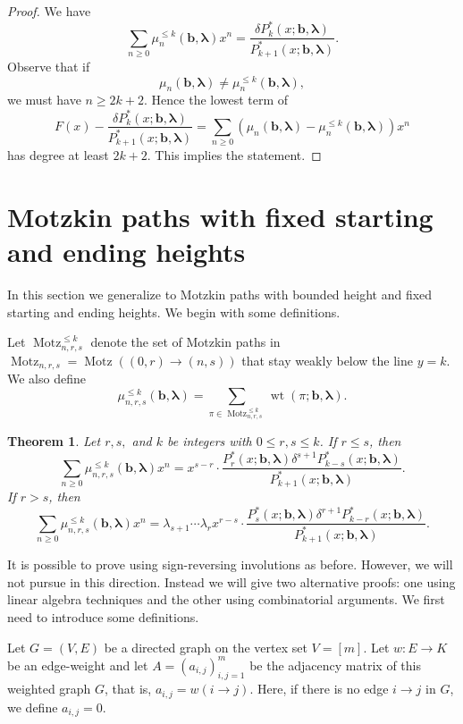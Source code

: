 \documentclass[oneside]{book}
\numberwithin{equation}{section}
\newtheorem{thm}{Theorem}[section]
\theoremstyle{definition}
\newcommand\Motz{\operatorname{Motz}}
\newcommand\wt{\operatorname{wt}}
\renewcommand\vec[1]{\bm{#1}}
\newcommand\vb{\vec{b}}
\newcommand\vla{\vec{\lambda}}
\begin{document}
\begin{proof}
  We have
\[
  \sum_{n\ge0} \mu_{n}^{\le k}(\vb,\vla) x^{n} = 
  \frac{\delta P^*_{k}(x;\vb,\vla)}{P^*_{k+1}(x;\vb,\vla)}.
\]
Observe that if
\[
  \mu_{n}(\vb,\vla) \ne \mu_{n}^{\le k}(\vb,\vla),
\]
we must have \( n \ge 2k+2 \).
Hence the lowest term of
\[
  F(x) - \frac{\delta P^*_{k}(x;\vb,\vla)}{P^*_{k+1}(x;\vb,\vla)} = \sum_{n\ge0}
  \left( \mu_{n}(\vb,\vla) -\mu_{n}^{\le k}(\vb,\vla) \right)
  x^{n}
\]
has degree at least \( 2k+2 \). This implies the statement.
\end{proof}

\section{Motzkin paths with fixed starting and ending heights}

In this section we generalize  to Motzkin paths with
bounded height and fixed starting and ending heights.
We begin with some definitions.

Let \( \Motz^{\le k}_{n,r,s} \) denote the set of Motzkin paths in
\( \Motz_{n,r,s} = \Motz((0,r)\to (n,s)) \) that stay weakly below
the line \( y=k \). We also define
\[
  \mu^{\le k}_{n,r,s}(\vb, \vla) = \sum_{\pi\in \Motz^{\le k}_{n,r,s}}
  \wt(\pi; \vb,\vla).
\]




\begin{thm}\label{thm:16}
Let \( r,s, \) and \( k \) be integers with \( 0\le r,s\le k \).
If \(r\le s\), then 
\[
  \sum_{n\ge0} \mu_{n,r,s}^{\le k}(\vb,\vla) x^n = x^{s-r} \cdot
  \frac{P^*_r(x;\vb,\vla) \delta^{s+1}
    P^*_{k-s}(x;\vb,\vla)}{P^*_{k+1}(x;\vb,\vla)}.
\]
  If \(r> s\), then
  \[
    \sum_{n\ge0} \mu_{n,r,s}^{\le k}(\vb,\vla) x^n = \lambda_{s+1}
    \cdots \lambda_rx^{r-s}\cdot \frac{ P^*_s(x;\vb,\vla) \delta^{r+1}
      P^*_{k-r}(x;\vb,\vla)}{P^*_{k+1}(x;\vb,\vla)} .
  \]
\end{thm}

It is possible to prove  using sign-reversing involutions
as before. However, we will not pursue in this direction. Instead we
will give two alternative proofs: one using linear algebra techniques
and the other using combinatorial arguments. We first need to
introduce some definitions.


Let \( G=(V,E) \) be a directed graph on the vertex set \( V=[m] \).
Let \( w:E\to K \) be an edge-weight and let
\( A = (a_{i,j})_{i,j=1}^m \) be the adjacency matrix of this weighted
graph \( G \), that is, \( a_{i,j} = w(i\to j) \). Here, if there is
no edge \( i\to j \) in \( G \), we define \( a_{i,j} = 0 \).
\end{document}
